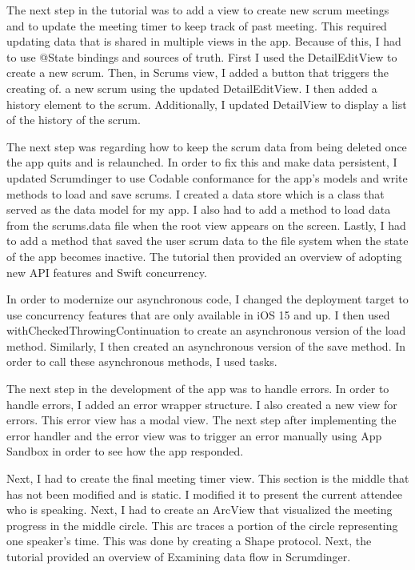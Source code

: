 \documentclass[10pt,twocolumn]{article}
\begin{document}
The next step in the tutorial was to add a view to create new scrum meetings and to update the meeting timer to keep track of past meeting. This required updating data that is shared in multiple views in the app. Because of this, I had to use @State bindings and sources of truth. First I used the DetailEditView to create a new scrum. Then, in Scrums view, I added a button that triggers the creating of. a new scrum using the updated DetailEditView. I then added a history element to the scrum. Additionally, I updated DetailView to display a list of the history of the scrum.

The next step was regarding how to keep the scrum data from being deleted once the app quits and is relaunched. In order to fix this and make data persistent, I updated Scrumdinger to use Codable conformance for the app’s models and write methods to load and save scrums. I created a data store which is a class that served as the data model for my app. I also had to add a method to load data from the scrums.data file when the root view appears on the screen. Lastly, I had to add a method that saved the user scrum data to the file system when the state of the app becomes inactive. The tutorial then provided an overview of adopting new API features and Swift concurrency. 

In order to modernize our asynchronous code, I changed the deployment target to use concurrency features that are only available in iOS 15 and up. I then used withCheckedThrowingContinuation to create an asynchronous version of the load method. Similarly, I then created an asynchronous version of the save method. In order to call these asynchronous methods, I used tasks.

The next step in the development of the app was to handle errors. In order to handle errors, I added an error wrapper structure. I also created a new view for errors. This error view has a modal view. The next step after implementing the error handler and the error view was to trigger an error manually using App Sandbox in order to see how the app responded. 

Next, I had to create the final meeting timer view. This section is the middle that has not been modified and is static. I modified it to present the current attendee who is speaking. Next, I had to create an ArcView that visualized the meeting progress in the middle circle. This arc traces a portion of the circle representing one speaker's time. This was done by creating a Shape protocol. Next, the tutorial provided an overview of Examining data flow in Scrumdinger.
\end{document}

